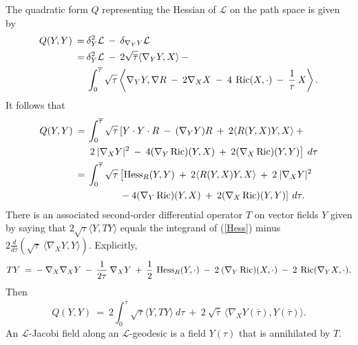 The quadratic form $Q$ representing the Hessian of ${\mathcal L}$ on the
path space is given by
\begin{align}
Q(Y, Y) \:  = \: & \delta_Y^2 {\mathcal L} \: - \: \delta_{\nabla_Y Y}
{\mathcal L} \\
= \:
& \delta_Y^2 {\mathcal L} \: - \:
2 \sqrt{\overline{\tau}} \langle \nabla_Y Y, X \rangle \:
-  \notag \\
& \int_0^{\overline{\tau}}
\sqrt{\tau} \left\langle \nabla_Y Y,
\nabla R
\: - \: 2 \nabla_X X  \: - \: 4 \: \operatorname{Ric}(X, \cdot) \: -\: \frac{1}{\tau}
\: X
\right\rangle. \notag
\end{align}
It follows that
\begin{align} \label{Hess}
Q(Y, Y) \: = \: &
\int_0^{\overline{\tau}}
\sqrt{\tau} \left[ Y \cdot Y \cdot R \: - \: (\nabla_Y Y) R \: + \:
2 \langle R(Y, X) Y, X \rangle \: + \right. \\
& \left. 2 \: |\nabla_X Y|^2
\: - \: 4 (\nabla_Y \operatorname{Ric}) (Y, X) \: + \: 2
(\nabla_X \operatorname{Ric}) (Y, Y) \right] \: d\tau \notag \\
= \: & \int_0^{\overline{\tau}}
\sqrt{\tau} \left[\operatorname{Hess}_R (Y,Y) \: + \:
2 \langle R(Y, X) Y, X \rangle \: + \: 2 \: |\nabla_X Y|^2 \right. \notag \\
&
\: \: \: \: \: \: \: \: \: \: \: \: \: \: \:
 \left. - \: 4 (\nabla_Y \operatorname{Ric}) (Y, X) \: + \: 2
(\nabla_X \operatorname{Ric}) (Y, Y) \right] \: d\tau. \notag
\end{align}
There is an associated second-order differential
operator $T$ on vector fields $Y$ given by saying that
$2 \sqrt{\tau} \langle Y, TY\rangle$ equals the integrand of (\ref{Hess}) minus
$2 \frac{d}{d\tau} \left( \sqrt{\tau} \: \langle \nabla_X Y, Y \rangle
\right)$.
Explicitly,
\begin{equation}
TY \: = \: - \: \nabla_X \nabla_X Y \: - \: \frac{1}{2\tau} \: \nabla_X Y
\: + \: \frac12 \: \operatorname{Hess}_R(Y, \cdot) \: - \: 2 \: (\nabla_Y \operatorname{Ric})(X, \cdot)
\: - \: 2 \: \operatorname{Ric}(\nabla_Y X, \cdot).
\end{equation}
Then
\begin{equation} \label{Qeqn}
Q(Y, Y) \: = \: 2 \int_0^{\overline{\tau}}
\sqrt{\tau} \langle Y, TY \rangle \: d\tau \: + \:
2 \: \sqrt{\overline{\tau}} \: \langle \nabla_X Y(\overline{\tau}),
Y(\overline{\tau}) \rangle.
\end{equation}
An ${\mathcal L}$-Jacobi field along an ${\mathcal L}$-geodesic
is a field $Y(\tau)$ that is annihilated by $T$.

